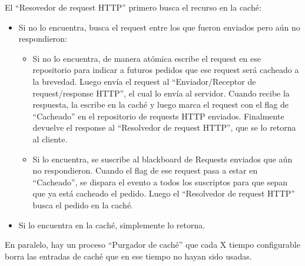 El ``Resovedor de request HTTP'' primero busca el recurso en la caché:
\begin{itemize}
	\item Si no lo encuentra, busca el request entre los que fueron enviados pero aún no respondieron:
	\begin{itemize}
		\item Si no lo encuentra, de manera atómica escribe el request en ese repositorio para indicar a futuros
        pedidos que ese request será cacheado a la brevedad. Luego envía el request al ``Enviador/Receptor de
        request/response HTTP'', el cual lo envía al servidor. Cuando recibe la respuesta, la escribe en la caché
        y luego marca el request con el flag de ``Cacheado'' en el repositorio de requests HTTP enviados. Finalmente
        devuelve el response al ``Resolvedor de request HTTP'', que se lo retorna al cliente.
        
        \item Si lo encuentra, se suscribe al blackboard de Requests enviados que aún no respondieron.
        Cuando el flag de ese request pasa a estar en ``Cacheado'', se dispara el evento
        a todos los suscriptos para que sepan que ya está cacheado el pedido. Luego el ``Resolvedor de
        request HTTP'' busca el pedido en la caché.
	\end{itemize}
	
	\item  Si lo encuentra en la caché, simplemente lo retorna.
\end{itemize}

En paralelo, hay un proceso ``Purgador de caché'' que cada X tiempo configurable borra las entradas
de caché que en ese tiempo no hayan sido usadas.